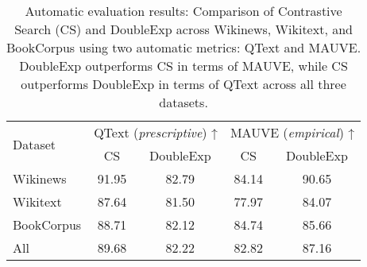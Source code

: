 \documentclass{article}
\theoremstyle{plain}
\theoremstyle{definition}
\theoremstyle{remark}
\begin{document}
\begin{table*}[t]
\centering
\small %
\caption{Automatic evaluation results: Comparison of Contrastive Search (CS) and DoubleExp across Wikinews, Wikitext, and BookCorpus using two automatic metrics: QText and MAUVE. DoubleExp outperforms CS in terms of MAUVE, while CS outperforms DoubleExp in terms of QText across all three datasets.}
\label{tab:autom_eval}
\begin{tabular}{|l|cc|cc|}
\hline
\multirow{2}{*}{Dataset} & \multicolumn{2}{c|}{QText (\textit{prescriptive}) ↑} & \multicolumn{2}{c|}{MAUVE (\textit{empirical}) ↑} \\

 & CS & DoubleExp  & CS & DoubleExp \\
\hline
Wikinews  & 91.95 & 82.79 & 84.14 & 90.65 \\
Wikitext  & 87.64 & 81.50   & 77.97 & 84.07  \\
BookCorpus     & 88.71 & 82.12  & 84.74 & 85.66 \\
\hline
\hline
All       & 89.68 & 82.22 & 82.82 & 87.16  \\
\hline
\end{tabular}
\end{table*}





\begin{table*}[t]
\centering
\caption{Human evaluation results: Human ratings of Contrastive Search (CS) and DoubleExp across Wikinews, Wikitext, and BookCorpus, focusing on perceived semantic coherence and fluency of the generated text. DoubleExp is consistently rejected by human evaluators.}
\label{tab:human_eval}


\end{table*}
\end{document}
